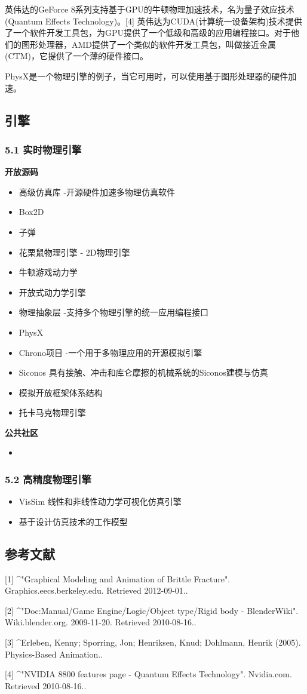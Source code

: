 英伟达的GeForce 8系列支持基于GPU的牛顿物理加速技术，名为量子效应技术(Quantum Effects Technology)。[4] 英伟达为CUDA(计算统一设备架构)技术提供了一个软件开发工具包，为GPU提供了一个低级和高级的应用编程接口。对于他们的图形处理器，AMD提供了一个类似的软件开发工具包，叫做接近金属(CTM)，它提供了一个薄的硬件接口。

PhysX是一个物理引擎的例子，当它可用时，可以使用基于图形处理器的硬件加速。
\subsection{引擎}
\subsubsection{5.1 实时物理引擎}
\textbf{开放源码}
\begin{itemize}
\item 高级仿真库 -开源硬件加速多物理仿真软件
\item Box2D
\item 子弹
\item 花栗鼠物理引擎 - 2D物理引擎
\item 牛顿游戏动力学
\item 开放式动力学引擎
\item 物理抽象层 -支持多个物理引擎的统一应用编程接口
\item PhysX
\item Chrono项目 -一个用于多物理应用的开源模拟引擎
\item Siconos 具有接触、冲击和库仑摩擦的机械系统的Siconos建模与仿真
\item 模拟开放框架体系结构
\item 托卡马克物理引擎
\end{itemize}

\textbf{公共社区}
\begin{itemize}
\item 
\end{itemize}


\subsubsection{5.2 高精度物理引擎}
\begin{itemize}
\item VisSim 线性和非线性动力学可视化仿真引擎
\item 基于设计仿真技术的工作模型
\end{itemize}
\subsection{参考文献}
[1]
^"Graphical Modeling and Animation of Brittle Fracture". Graphics.eecs.berkeley.edu. Retrieved 2012-09-01..

[2]
^"Doc:Manual/Game Engine/Logic/Object type/Rigid body - BlenderWiki". Wiki.blender.org. 2009-11-20. Retrieved 2010-08-16..

[3]
^Erleben, Kenny; Sporring, Jon; Henriksen, Knud; Dohlmann, Henrik (2005). Physics-Based Animation..

[4]
^"NVIDIA 8800 features page - Quantum Effects Technology". Nvidia.com. Retrieved 2010-08-16..